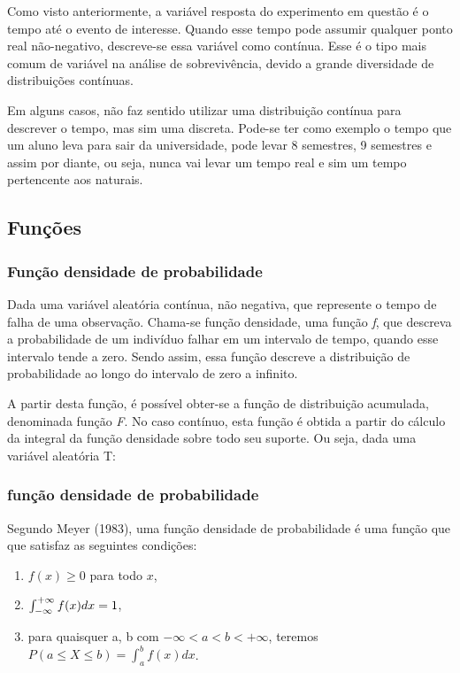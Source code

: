 Como visto anteriormente, a variável resposta do experimento em questão é o tempo até o evento de interesse. Quando esse tempo pode assumir qualquer ponto real não-negativo, descreve-se essa variável como contínua. Esse é o tipo mais comum de variável na análise de sobrevivência, devido a grande diversidade de distribuições contínuas. %

Em alguns casos, não faz sentido utilizar uma distribuição contínua para descrever o tempo, mas sim uma discreta. Pode-se ter como exemplo o tempo que um aluno leva para sair da universidade, pode levar 8 semestres, 9 semestres e assim por diante, ou seja, nunca vai levar um tempo real e sim um tempo pertencente aos naturais.%

\subsection*{Funções}

\subsubsection*{Função densidade de probabilidade}

Dada uma variável aleatória contínua, não negativa, que represente o tempo de falha de uma observação. Chama-se função densidade, uma função \textit{f}, que descreva a probabilidade de um indivíduo falhar em um intervalo de tempo, quando esse intervalo tende a zero. Sendo assim, essa função descreve a distribuição de probabilidade ao longo do intervalo de zero a infinito.

A partir desta função, é possível obter-se a função de distribuição acumulada, denominada função \textit{F}. No caso contínuo, esta função é obtida a partir do cálculo da integral da função densidade sobre todo seu suporte. Ou seja, dada uma variável aleatória T:

\subsubsection*{função densidade de probabilidade}

Segundo Meyer (1983), uma função densidade de probabilidade é uma função que que satisfaz as seguintes condições:%

\begin{enumerate}

	\item $f(x) \ge 0$ para todo $x$,
	\item $\int_{\tiny{-\infty}}^{\tiny{+\infty}} f(x)dx = 1$,
	\item para quaisquer a, b com $-\infty < a < b < +\infty$, teremos $P(a \le X \le b) = \int_a^b f(x)dx$.
\end{enumerate}
	 
